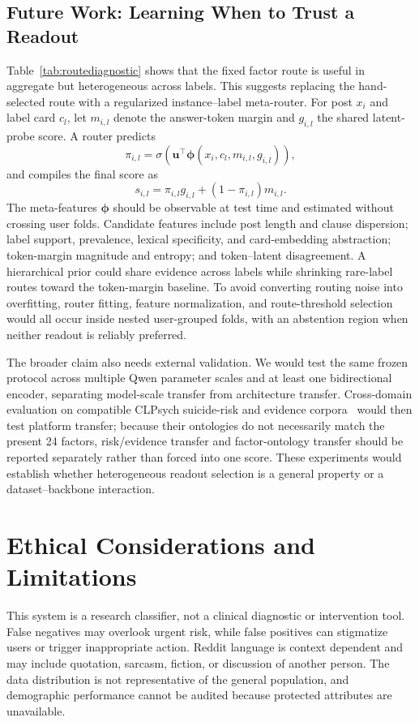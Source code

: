 \documentclass[conference]{IEEEtran}
\begin{document}
\subsection{Future Work: Learning When to Trust a Readout}
Table~\ref{tab:routediagnostic} shows that the fixed factor route is useful in aggregate but heterogeneous across labels. This suggests replacing the hand-selected route with a regularized instance--label meta-router. For post $x_i$ and label card $c_l$, let $m_{i,l}$ denote the answer-token margin and $g_{i,l}$ the shared latent-probe score. A router predicts
\begin{equation}
\pi_{i,l}=\sigma\!\left(\mathbf{u}^{\top}\boldsymbol{\phi}(x_i,c_l,m_{i,l},g_{i,l})\right),
\end{equation}
and compiles the final score as
\begin{equation}
s_{i,l}=\pi_{i,l}g_{i,l}+(1-\pi_{i,l})m_{i,l}.
\end{equation}
The meta-features $\boldsymbol{\phi}$ should be observable at test time and estimated without crossing user folds. Candidate features include post length and clause dispersion; label support, prevalence, lexical specificity, and card-embedding abstraction; token-margin magnitude and entropy; and token--latent disagreement. A hierarchical prior could share evidence across labels while shrinking rare-label routes toward the token-margin baseline. To avoid converting routing noise into overfitting, router fitting, feature normalization, and route-threshold selection would all occur inside nested user-grouped folds, with an abstention region when neither readout is reliably preferred.

The broader claim also needs external validation. We would test the same frozen protocol across multiple Qwen parameter scales and at least one bidirectional encoder, separating model-scale transfer from architecture transfer. Cross-domain evaluation on compatible CLPsych suicide-risk and evidence corpora~\cite{chim2024overview} would then test platform transfer; because their ontologies do not necessarily match the present 24 factors, risk/evidence transfer and factor-ontology transfer should be reported separately rather than forced into one score. These experiments would establish whether heterogeneous readout selection is a general property or a dataset--backbone interaction.

\section{Ethical Considerations and Limitations}
This system is a research classifier, not a clinical diagnostic or intervention tool. False negatives may overlook urgent risk, while false positives can stigmatize users or trigger inappropriate action. Reddit language is context dependent and may include quotation, sarcasm, fiction, or discussion of another person. The data distribution is not representative of the general population, and demographic performance cannot be audited because protected attributes are unavailable.
\end{document}
